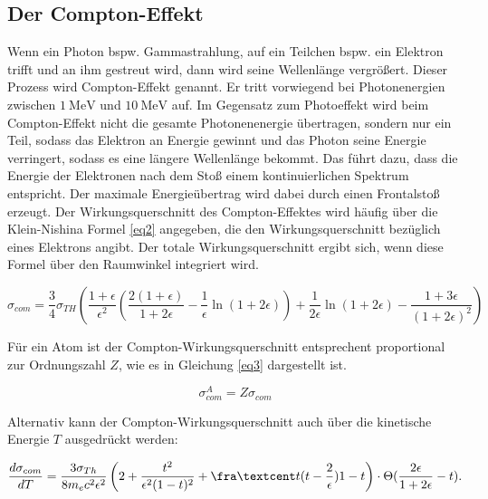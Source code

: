 \subsection{Der Compton-Effekt}
Wenn ein Photon bspw. Gammastrahlung, auf ein Teilchen bspw. ein Elektron trifft
und an ihm gestreut wird, dann wird seine Wellenlänge vergrößert. 
Dieser Prozess wird Compton-Effekt genannt.
Er tritt vorwiegend bei Photonenergien zwischen $\SI{1}{\mega\electronvolt}$ und 
$\SI{10}{\mega\electronvolt}$ auf.
Im Gegensatz zum Photoeffekt wird beim Compton-Effekt nicht die 
gesamte Photonenenergie übertragen, sondern nur ein Teil, sodass das Elektron an 
Energie gewinnt und das Photon seine Energie verringert, sodass es eine längere 
Wellenlänge bekommt. Das führt dazu, dass die Energie der Elektronen nach dem 
Stoß einem kontinuierlichen Spektrum entspricht.
Der maximale Energieübertrag wird dabei durch einen Frontalstoß erzeugt.
Der Wirkungsquerschnitt des Compton-Effektes wird häufig über die 
Klein-Nishina Formel \ref{eq2} angegeben, die den Wirkungsquerschnitt bezüglich 
eines Elektrons angibt. Der totale Wirkungsquerschnitt ergibt sich, wenn diese 
Formel über den Raumwinkel integriert wird.

\begin{equation}
    \sigma_{com} = \frac{3}{4}\sigma_{TH} \left(\frac{1 + \epsilon}{\epsilon^2} \left(\frac{2(1+\epsilon)}{1+2\epsilon} - \frac{1}{\epsilon} \ln(1+2\epsilon) \right) + \frac{1}{2\epsilon} \ln(1+2\epsilon) - \frac{1+3\epsilon}{(1+2\epsilon)^2} \right)
    \label{eq2}
\end{equation}

Für ein Atom ist der Compton-Wirkungsquerschnitt entsprechent proportional zur 
Ordnungszahl $Z$, wie es in Gleichung \ref{eq3} dargestellt ist.

\begin{equation}
    \sigma^A_{com} = Z \sigma_{com}
    \label{eq3}
\end{equation}

Alternativ kann der Compton-Wirkungsquerschnitt auch über die kinetische 
Energie $T$ ausgedrückt werden:

\begin{equation}
    \frac{d \sigma_{com}}{dT} = \frac{3\sigma_{Th}}{8 m_e c^2 \epsilon^2} \left(2+ \frac{t^2}{\epsilon^2(1-t)^2} + \fra¢{t(t-\frac{2}{\epsilon})}{1-t} \right) \cdot \Theta( \frac{2 \epsilon}{1+ 2 \epsilon}-t).
    \label{2.12}
\end{equation}

